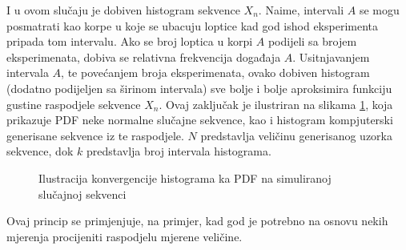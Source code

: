 I u ovom slučaju je dobiven histogram sekvence $X_n$. Naime, intervali $A$ se
mogu posmatrati kao korpe u koje se ubacuju loptice kad god ishod eksperimenta
pripada tom intervalu. Ako se broj loptica u korpi $A$ podijeli sa brojem
eksperimenata, dobiva se relativna frekvencija događaja $A$.  Usitnjavanjem
intervala $A$, te povećanjem broja eksperimenata, ovako dobiven histogram
(dodatno podijeljen sa širinom intervala) sve bolje i bolje aproksimira funkciju
gustine raspodjele sekvence $X_n$. Ovaj zaključak je ilustriran na slikama
\ref{fig:lln-hist}, koja prikazuje PDF neke normalne slučajne sekvence, kao i
histogram kompjuterski generisane sekvence iz te raspodjele. $N$ predstavlja
veličinu generisanog uzorka sekvence, dok $k$ predstavlja broj intervala
histograma.

\begin{figure}[H]
  \centering
  \caption{Ilustracija konvergencije histograma ka PDF na simuliranoj slučajnoj
  sekvenci}
  \label{fig:lln-hist}
\end{figure}

Ovaj princip se primjenjuje, na primjer, kad god je potrebno na osnovu nekih
mjerenja procijeniti raspodjelu mjerene veličine.
